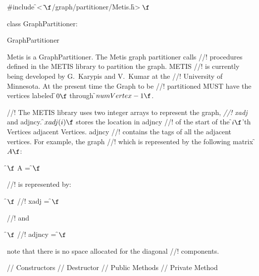 
\indent \#include \f$<\tilde{ }\f$/graph/partitioner/Metis.h\f$>\f$

\indent class GraphPartitioner:

\indent GraphPartitioner
\indent{}

\indent Metis is a GraphPartitioner. The Metis graph partitioner calls
//! procedures defined in the METIS library to partition the graph. METIS
//! is currently being developed by G.~Karypis and V.~Kumar at the
//! University of Minnesota. At the present time the Graph to be
//! partitioned MUST have the vertices labeled \f$0\f$ through \f$numVertex-1\f$.

//! The METIS library uses two integer arrays to represent the graph, {\em
//! xadj} and \p adjncy. \f$xadj(i)\f$ stores the location in \p adjncy
//! of the start of the \f$i\f$'th Vertices adjacent Vertices. \p adjncy
//! contains the tags of all the adjacent vertices. For example, the graph
//! which is represented by the following matrix \f$A\f$:


\f$\f$ A =
\f$\f$

//! is represented by:

\f$\f$
//! xadj =
\f$\f$

//! and

\f$\f$
//! adjncy =
\f$\f$

\noindent note that there is no space allocated for the diagonal
//! components.

\indent\indent // Constructors
\indent{}
\indent{}
\indent\indent // Destructor
\indent{}
\indent\indent // Public Methods
\indent{}
\indent{}
\indent{}
\indent\indent // Private Method
\indent{}


